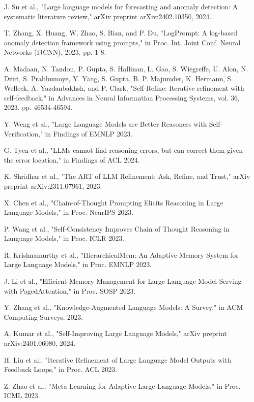 \documentclass[conference]{IEEEtran}
\begin{document}
\begin{thebibliography}{00}
 J. Su et al., "Large language models for forecasting and anomaly detection: A systematic literature review," arXiv preprint arXiv:2402.10350, 2024.

 T. Zhang, X. Huang, W. Zhao, S. Bian, and P. Du, "LogPrompt: A log-based anomaly detection framework using prompts," in Proc. Int. Joint Conf. Neural Networks (IJCNN), 2023, pp. 1-8.

 A. Madaan, N. Tandon, P. Gupta, S. Hallinan, L. Gao, S. Wiegreffe, U. Alon, N. Dziri, S. Prabhumoye, Y. Yang, S. Gupta, B. P. Majumder, K. Hermann, S. Welleck, A. Yazdanbakhsh, and P. Clark, "Self-Refine: Iterative refinement with self-feedback," in Advances in Neural Information Processing Systems, vol. 36, 2023, pp. 46534-46594.

 Y. Weng et al., "Large Language Models are Better Reasoners with Self-Verification," in Findings of EMNLP 2023.

 G. Tyen et al., "LLMs cannot find reasoning errors, but can correct them given the error location," in Findings of ACL 2024.

 K. Shridhar et al., "The ART of LLM Refinement: Ask, Refine, and Trust," arXiv preprint arXiv:2311.07961, 2023.

 X. Chen et al., "Chain-of-Thought Prompting Elicits Reasoning in Large Language Models," in Proc. NeurIPS 2023.

 P. Wang et al., "Self-Consistency Improves Chain of Thought Reasoning in Language Models," in Proc. ICLR 2023.

 R. Krishnamurthy et al., "HierarchicalMem: An Adaptive Memory System for Large Language Models," in Proc. EMNLP 2023.

 J. Li et al., "Efficient Memory Management for Large Language Model Serving with PagedAttention," in Proc. SOSP 2023.

 Y. Zhang et al., "Knowledge-Augmented Language Models: A Survey," in ACM Computing Surveys, 2023.

 A. Kumar et al., "Self-Improving Large Language Models," arXiv preprint arXiv:2401.06080, 2024.

 H. Liu et al., "Iterative Refinement of Large Language Model Outputs with Feedback Loops," in Proc. ACL 2023.

 Z. Zhao et al., "Meta-Learning for Adaptive Large Language Models," in Proc. ICML 2023.
\end{thebibliography}
\vspace{12pt}
\end{document}

